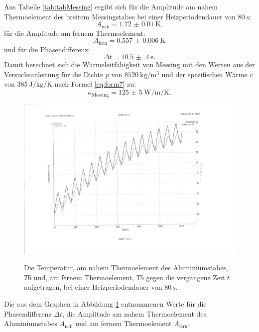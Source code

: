 Aus Tabelle \ref{tab:tabMessing} ergibt sich für die Amplitude am nahem Thermoelement des breitem Messingstabes bei einer Heizperiodendauer von $\SI{80}{\second}$:
\begin{displaymath}
A_\text{nah} = \SI{1.72(1)}{\kelvin}\text{,}
\end{displaymath}
für die Amplitude am fernem Thermoelement:
\begin{displaymath}
A_\text{fern} = \SI{0.557(6)}{\kelvin}
\end{displaymath}
und für die Phasendifferenz:
\begin{displaymath}
\Delta t = \SI{10.5(4)}{\second}\text{.}
\end{displaymath}
Damit berechnet sich die Wärmeleitfähigkeit von Messing mit den Werten aus der Versuchsanleitung \cite{V204} für die Dichte $p$ von $\SI{8520}{\kilo\gram\per\meter\tothe{3}}$ und der spezifischen Wärme $c$ von $\SI{385}{\joule\per\kilo\gram\per\kelvin}$ nach Formel \eqref{eq:form7} zu:
\begin{displaymath}
\kappa_\text{Messing} = \SI{125(5)}{\watt\per\meter\per\kelvin}\text{.}
\end{displaymath}
\begin{figure}
	\centering
	\caption{Die Temperatur, am nahem Thermoelement des Aluminiumstabes, $T6$ und, am fernem Thermoelement, $T5$ gegen die vergangene Zeit $t$ aufgetragen, bei einer Heizperiodendauer von $\SI{80}{\second}$.}
	\includegraphics[width=\linewidth-70pt,height=\textheight-70pt,keepaspectratio]{content/Bilder/T5T6-rotated.pdf}
	\label{fig:Graph6}
\end{figure}
\begin{table}
	\centering
	\caption{Die aus dem Graphen in Abbildung \ref{fig:Graph6} entnommenen Werte für die Phasendifferenz $\Delta t$, die Amplitude am nahem Thermoelement des Aluminiumstabes $A_\text{nah}$ und am fernem Thermoelement $A_\text{fern}$.}
	
\end{table}

